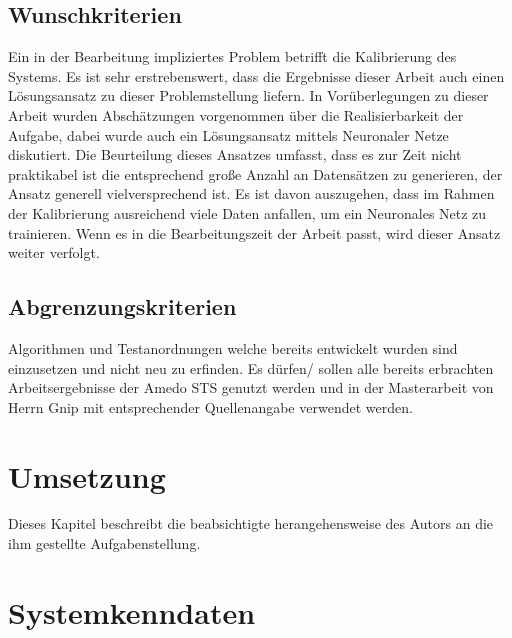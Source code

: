 \documentclass[a4paper,12pt,fleqn]{article}
\begin{document}
\subsection{Wunschkriterien}
Ein in der Bearbeitung impliziertes Problem betrifft die Kalibrierung des Systems. Es ist sehr erstrebenswert, dass die Ergebnisse dieser Arbeit auch einen Lösungsansatz zu dieser Problemstellung liefern. In Vorüberlegungen zu dieser Arbeit wurden Abschätzungen vorgenommen über die Realisierbarkeit der Aufgabe, dabei wurde auch ein Lösungsansatz mittels Neuronaler Netze diskutiert. Die Beurteilung dieses Ansatzes umfasst, dass es zur Zeit nicht praktikabel ist die entsprechend große Anzahl an Datensätzen zu generieren, der Ansatz generell vielversprechend ist. Es ist davon auszugehen, dass im Rahmen der Kalibrierung ausreichend viele Daten anfallen, um ein Neuronales Netz zu trainieren. Wenn es in die Bearbeitungszeit der Arbeit passt, wird dieser Ansatz weiter verfolgt.

\subsection{Abgrenzungskriterien}
Algorithmen und Testanordnungen welche bereits entwickelt wurden sind einzusetzen und nicht neu zu erfinden. Es dürfen/ sollen alle bereits erbrachten Arbeitsergebnisse der Amedo STS genutzt werden und in der Masterarbeit von Herrn Gnip mit entsprechender Quellenangabe verwendet werden.

\section{Umsetzung}
Dieses Kapitel beschreibt die beabsichtigte herangehensweise des Autors an die
ihm gestellte Aufgabenstellung.
\subsection{}

\section{Systemkenndaten}
\end{document}
